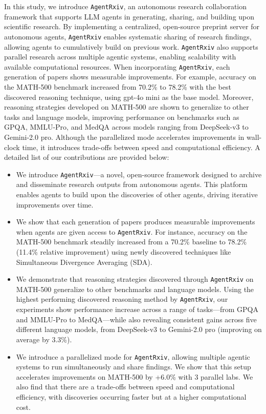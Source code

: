 \documentclass[11pt, a4paper]{include/gdm_format}
\begin{document}
In this study, we introduce \texttt{AgentRxiv}, an autonomous research collaboration framework that supports LLM agents in generating, sharing, and building upon scientific research. By implementing a centralized, open-source preprint server for autonomous agents, \texttt{AgentRxiv} enables systematic sharing of research findings, allowing agents to cumulatively build on previous work. \texttt{AgentRxiv} also supports parallel research across multiple agentic systems, enabling scalability with available computational resources. When incorporating \texttt{AgentRxiv}, each generation of papers shows measurable improvements. For example, accuracy on the MATH-500 benchmark increased from 70.2\% to 78.2\% with the best discovered reasoning technique, using gpt-4o mini as the base model. Moreover, reasoning strategies developed on MATH-500 are shown to generalize to other tasks and language models, improving performance on benchmarks such as GPQA, MMLU-Pro, and MedQA across models ranging from DeepSeek-v3 to Gemini-2.0 pro. Although the parallelized mode accelerates improvements in wall-clock time, it introduces trade-offs between speed and computational efficiency. A detailed list of our contributions are provided below:


\begin{itemize}
    \item We introduce \texttt{AgentRxiv}—a novel, open-source framework designed to archive and disseminate research outputs from autonomous agents. This platform enables agents to build upon the discoveries of other agents, driving iterative improvements over time.
    \item We show that each generation of papers produces measurable improvements when agents are given access to \texttt{AgentRxiv}. For instance, accuracy on the MATH-500 benchmark steadily increased from a 70.2\% baseline to 78.2\% (11.4\% relative improvement) using newly discovered techniques like Simultaneous Divergence Averaging (SDA).
    \item We demonstrate that reasoning strategies discovered through \texttt{AgentRxiv} on MATH-500 generalize to other benchmarks and language models. Using the highest performing discovered reasoning method by \texttt{AgentRxiv}, our experiments show performance increase across a range of tasks—from GPQA and MMLU-Pro to MedQA—while also revealing consistent gains across five different language models, from DeepSeek-v3 to Gemini-2.0 pro (improving on average by 3.3\%).
    \item We introduce a parallelized mode for \texttt{AgentRxiv}, allowing multiple agentic systems to run simultaneously and share findings. We show that this setup accelerates improvements on MATH-500 by +6.0\% with 3 parallel labs. We also find that there are a trade-offs between speed and computational efficiency, with discoveries occurring faster but at a higher computational cost.


\end{itemize}
\end{document}
